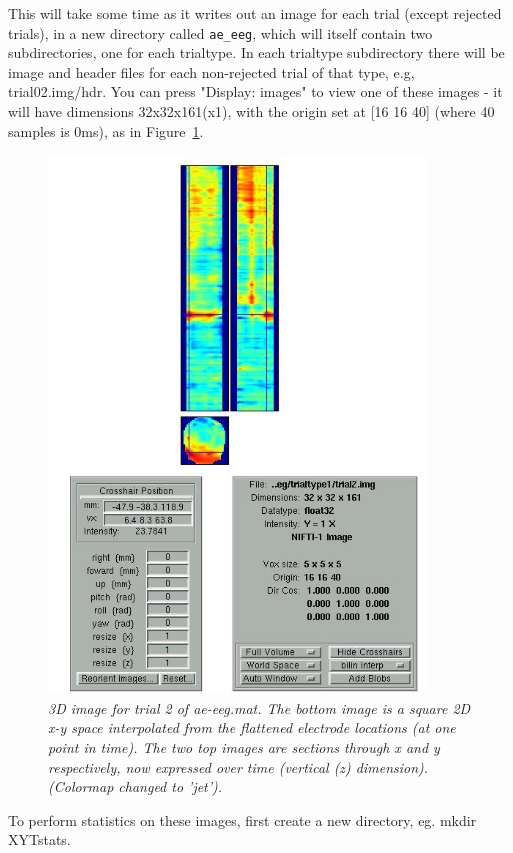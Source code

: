 This will take some time as it writes out an image for each trial (except rejected trials), in a new directory called \verb!ae_eeg!, which will itself contain two subdirectories, one for each trialtype. In each trialtype subdirectory there will be image and header files for each non-rejected trial of that type, e.g, trial02.img/hdr. You can press "Display: images" to view one of these images - it will have dimensions 32x32x161(x1), with the origin set at [16  16  40] (where 40 samples is 0ms), as in Figure~\ref{fig_32_6}.


\begin{figure}
\begin{center}
\includegraphics[width=100mm]{multimodal/figures/figure_32_6}
\caption{\em  3D image for trial 2 of ae-eeg.mat. The bottom image is a square 2D x-y space interpolated from the flattened electrode locations (at one point in time). The two top images are sections through x and y respectively, now expressed over time (vertical (z) dimension). (Colormap changed to 'jet').\label{fig_32_6}}
\end{center}
\end{figure}


To perform statistics on these images, first create a new directory, eg. mkdir XYTstats.

